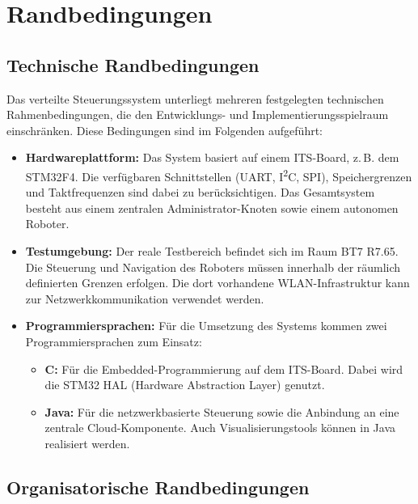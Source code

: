 \chapter{Randbedingungen}

\section{Technische Randbedingungen}

Das verteilte Steuerungssystem unterliegt mehreren festgelegten technischen Rahmenbedingungen, die den Entwicklungs- und Implementierungsspielraum einschränken. Diese Bedingungen sind im Folgenden aufgeführt:

\begin{itemize}
    \item \textbf{Hardwareplattform:}  
    Das System basiert auf einem ITS-Board, z. B. dem STM32F4. Die verfügbaren Schnittstellen (UART, I\textsuperscript{2}C, SPI), Speichergrenzen und Taktfrequenzen sind dabei zu berücksichtigen. Das Gesamtsystem besteht aus einem zentralen Administrator-Knoten sowie einem autonomen Roboter.

    \item \textbf{Testumgebung:}  
    Der reale Testbereich befindet sich im Raum BT7 R7.65. Die Steuerung und Navigation des Roboters müssen innerhalb der räumlich definierten Grenzen erfolgen. Die dort vorhandene WLAN-Infrastruktur kann zur Netzwerkkommunikation verwendet werden.

    \item \textbf{Programmiersprachen:}  
    Für die Umsetzung des Systems kommen zwei Programmiersprachen zum Einsatz:
    \begin{itemize}
        \item \textbf{C:} Für die Embedded-Programmierung auf dem ITS-Board. Dabei wird die STM32 HAL (Hardware Abstraction Layer) genutzt.
        \item \textbf{Java:} Für die netzwerkbasierte Steuerung sowie die Anbindung an eine zentrale Cloud-Komponente. Auch Visualisierungstools können in Java realisiert werden.
    \end{itemize}
\end{itemize}

\section{Organisatorische Randbedingungen}

